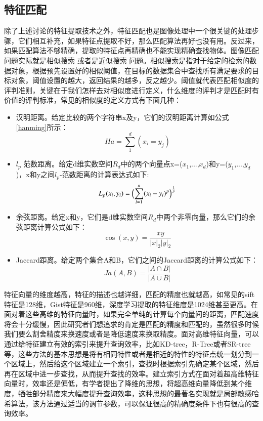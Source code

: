 \subsection{特征匹配}
除了上述讨论的特征提取技术之外，特征匹配也是图像处理中一个很关键的处理步骤，它们相互补充，如果特征点提取不好，那么匹配算法再好也没有用。反过来，如果匹配算法不够精确，提取的特征点再精确也不能实现精确查找物体。图像匹配问题实际就是相似搜索 或者是近似搜索 问题。相似搜索是指对于给定的检索的数据对象，根据预先设置好的相似阈值，在目标的数据集合中查找所有满足要求的目标对象，阈值设置的越大，返回结果的越多，反之越少。阈值就代表匹配相似度的评判准则，关键在于我们怎样去对相似度进行定义，什么维度的评判才是匹配时有价值的评判标准，常见的相似度的定义方式有下面几种：
\begin{itemize}
\item 汉明距离。给定比较的两个字符串x及y，它们的汉明距离计算如公式\ref{hanming}所示：
\begin{equation}\label{hanming}
Ha=\sum_{1}^d(x_i=y_j)
\end{equation}

\item $l_p$ 范数距离。给定d维实数空间$R_d$中的两个向量点x=($x_1$,...,$x_d$)和y=($y_1$,...,$y_d$)，x和y之间$l_p$-范数距离的计算表达式如下:
\begin{equation}\label{fanshu}
L_p(x_i,y_i)=\Bigl(\sum_{l=1}^n(x_i-y_i)^p\Bigr)^\frac{1}{p}
\end{equation}

\item 余弦距离。给定x和y，它们是d维实数空间$R_d$中两个非零向量，那么它们的余弦距离计算公式如下：
\begin{equation}\label{yuxian}
\cos(x,y)=\frac{xy}{|x|_2|y|_2}
\end{equation}

\item Jaccard距离。给定两个集合A和B，它们之间的Jaccard距离的计算公式如下：
\begin{equation}\label{Jaccard}
Ja(A,B)=\frac{|{A}\cap{B}|}{|{A}\cup{B}|}
\end{equation}
\end{itemize}

特征向量的维度越高，特征的描述也越详细，匹配的精度也就越高，如常见的sift特征是128维，Gist特征是960维，深度学习提取的特征维度是1024维甚至更高。在面对着这些高维的特征向量时，如果完全单纯的计算每个向量间的距离，匹配速度将会十分缓慢，因此研究者们想追求的肯定是匹配的精度和匹配的，虽然很多时候我们要么割舍精度来换速度或者是降低速度来换取精度。面对高维特征向量，可以通过给特征建立有效的索引来提升查询效率，比如KD-tree，R-Tree或者SR-tree 等，这些方法的基本思想是将有相同特性或者是相近的特性的特征点统一划分到一个区域上，然后给这个区域建立一个索引，查找时根据索引先确定某个区域，然后再在区域中进一步查找，从而提升查找的效率。建立索引方式在面对着超高维特征向量时，效率还是偏低，有学者提出了降维的思想，将超高维向量降低到某个维度，牺牲部分精度来大幅度提升查询效率，这种思想的最著名实现就是局部敏感哈希算法，该方法通过适当的调节参数，可以保证很高的精确度条件下也有很高的查询效率。

